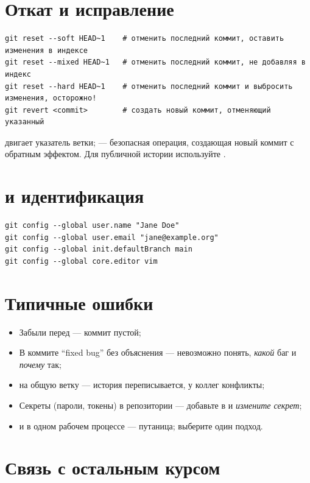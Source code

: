\section{Откат и исправление}

\begin{verbatim}
git reset --soft HEAD~1    # отменить последний коммит, оставить изменения в индексе
git reset --mixed HEAD~1   # отменить последний коммит, не добавляя в индекс
git reset --hard HEAD~1    # отменить последний коммит и выбросить изменения, осторожно!
git revert <commit>        # создать новый коммит, отменяющий указанный
\end{verbatim}

 двигает указатель ветки;  ---
безопасная операция, создающая новый коммит с
обратным эффектом. Для публичной истории используйте
.

\section{ и идентификация}

\begin{verbatim}
git config --global user.name "Jane Doe"
git config --global user.email "jane@example.org"
git config --global init.defaultBranch main
git config --global core.editor vim
\end{verbatim}

\section{Типичные ошибки}
\begin{itemize}
  \item Забыли  перед  ---
    коммит пустой;
  \item В коммите ``fixed bug'' без объяснения ---
    невозможно понять, \emph{какой} баг и \emph{почему}
    так;
  \item {} на общую ветку ---
    история переписывается, у коллег конфликты;
  \item Секреты (пароли, токены) в репозитории ---
    добавьте в  и \emph{измените
    секрет};
  \item {} и  в одном
    рабочем процессе --- путаница; выберите один
    подход.
\end{itemize}

\section{Связь с остальным курсом}

